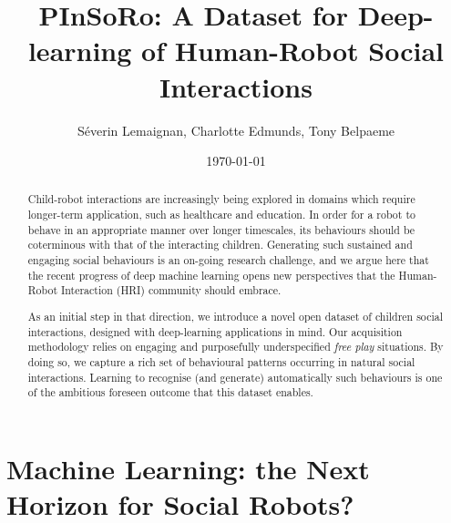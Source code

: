 \documentclass{article}
\title{PInSoRo: A Dataset for Deep-learning of Human-Robot Social Interactions}
\author{Séverin Lemaignan, Charlotte Edmunds, Tony Belpaeme}
\date{\today}
\begin{document}
\maketitle

\begin{abstract}


Child-robot interactions are increasingly being explored in domains which
require longer-term application, such as healthcare and education. In order
for a robot to behave in an appropriate manner over longer timescales, its
behaviours should be coterminous with that of the interacting children.
Generating such sustained and engaging social behaviours is an on-going research
challenge, and we argue here that the recent progress of deep machine learning
opens new perspectives that the Human-Robot Interaction (HRI) community
should embrace.

As an initial step in that direction, we introduce a novel
open dataset of children social interactions, designed with
deep-learning applications in mind. Our acquisition methodology relies on
engaging and purposefully underspecified \emph{free play} situations. By doing
so, we capture a rich set of behavioural patterns occurring in natural
social interactions. Learning to recognise (and generate) automatically such
behaviours is one of the ambitious foreseen outcome that this dataset enables.


\end{abstract}

\section{Machine Learning: the Next Horizon for Social Robots?}
\end{document}
